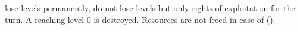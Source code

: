 
\bparag \TP lose levels permanently, \COL do not lose levels but only rights
of exploitation for the turn. A \TP reaching level 0 is destroyed.
\bparag Resources are not freed in case of 
().%

